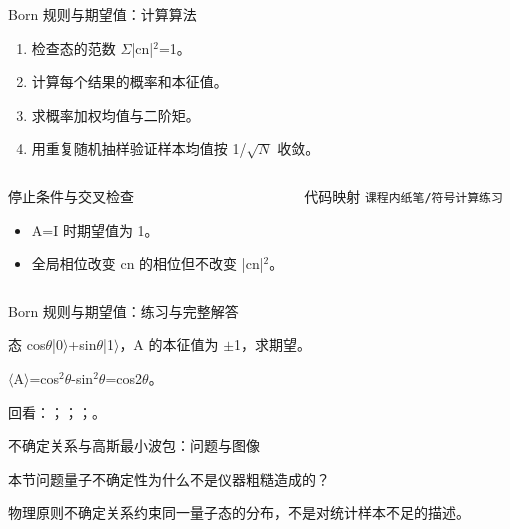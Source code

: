 \begin{frame}[t]{Born 规则与期望值：计算算法}
\footnotesize
{}\begin{enumerate}
\item 检查态的范数 \ensuremath{\Sigma}|cn|\ensuremath{^{2}}=1。
\item 计算每个结果的概率和本征值。
\item 求概率加权均值与二阶矩。
\item 用重复随机抽样验证样本均值按 1/\allowbreak{}\ensuremath{\sqrt{N}} 收敛。
\end{enumerate}\begin{columns}[T,onlytextwidth]
\begin{block}{停止条件与交叉检查}\scriptsize\begin{itemize}
\item[\CheckMark] A=I 时期望值为 1。
\item[\CheckMark] 全局相位改变 cn 的相位但不改变 |cn|\ensuremath{^{2}}。
\end{itemize}\end{block}
\begin{block}{代码映射}
\scriptsize \texttt{课程内纸笔/\allowbreak{}符号计算练习}
\end{block}\end{columns}\end{frame}

\begin{frame}[t]{Born 规则与期望值：练习与完整解答}
\footnotesize
\begin{block}{}态 cos\ensuremath{\theta}|0\ensuremath{\rangle}+sin\ensuremath{\theta}|1\ensuremath{\rangle}，A 的本征值为 \ensuremath{\pm}1，求期望。\end{block}
\begin{exampleblock}{}\ensuremath{\langle}A\ensuremath{\rangle}=cos\ensuremath{^{2}}\ensuremath{\theta}-sin\ensuremath{^{2}}\ensuremath{\theta}=cos2\ensuremath{\theta}。\end{exampleblock}
\vfill
\scriptsize 回看：；；；。
\end{frame}

\begin{frame}[t]{不确定关系与高斯最小波包：问题与图像}
\footnotesize
\begin{block}{本节问题}量子不确定性为什么不是仪器粗糙造成的？\end{block}
\begin{block}{物理原则}\quad 不确定关系约束同一量子态的分布，不是对统计样本不足的描述。\end{block}
\end{frame}

